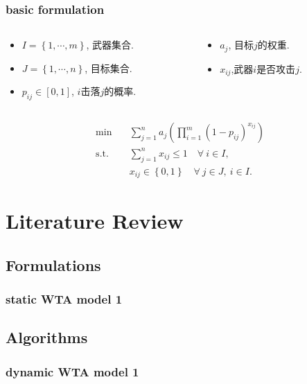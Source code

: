 \documentclass[10pt]{beamer}
\begin{document}
\begin{frame}
    \frametitle{basic formulation}
    \begin{columns}
        \begin{column}{.70\linewidth}
            \footnotesize
            \begin{itemize}
                \item $I = \left\{1,\cdots,m\right\} $, 武器集合.
                \item $J = \left\{1,\cdots,n\right\} $, 目标集合.
                \item $p_{ij}\in [0,1]$, $i$击落$j$的概率.
            \end{itemize}
        \end{column}
    \hspace{-1cm}
        \begin{column}{.35\linewidth}
            \footnotesize
            \begin{itemize}
                \item $a_j$, 目标$j$的权重.
                \item $x_{ij}$,武器$i$是否攻击$j$.
            \end{itemize}
        \end{column}
    \end{columns}
    
    \begin{align}
        \min\quad & \sum_{j=1}^n a_j \left( \prod_{i=1}^m (1 -  p_{ij})^{x_{ij}} \right) \\ 
        \mathrm{s. t.}\quad &\sum_{j=1}^n x_{ij} \leq 1\quad \forall ~i \in I,\\
        & x_{ij} \in \left\{ 0,1 \right\} \quad \forall~ j\in J , ~ i \in I.
    \end{align}
\end{frame}

\section{Literature Review}
\subsection{Formulations}
\begin{frame}
    \frametitle{static WTA model 1}
\end{frame}

\subsection{Algorithms}
\begin{frame}
    \frametitle{dynamic WTA model 1}
\end{frame}
\end{document}
